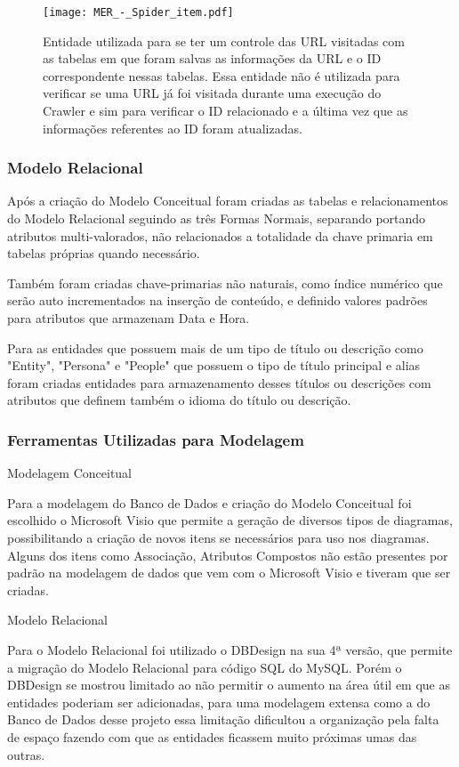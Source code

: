\documentclass[12pt]{article}
\begin{document}
\begin{figure}[H]
\centering
\texttt{[image: MER\_-\_Spider\_item.pdf]}
\caption{Entidade utilizada para se ter um controle das URL visitadas com as tabelas em que foram salvas as informações da URL e o ID correspondente nessas tabelas. Essa entidade não é utilizada para verificar se uma URL já foi visitada durante uma execução do Crawler e sim para verificar o ID relacionado e a última vez que as informações referentes ao ID foram atualizadas.} \label{hash}
\end{figure}

\subsubsection{Modelo Relacional}

Após a criação do Modelo Conceitual foram criadas as tabelas e relacionamentos do Modelo Relacional seguindo as três Formas Normais, separando portando atributos multi-valorados, não relacionados a totalidade da chave primaria em tabelas próprias quando necessário.

Também foram criadas chave-primarias não naturais, como índice numérico que serão auto incrementados na inserção de conteúdo, e definido valores padrões para atributos que armazenam Data e Hora.

Para as entidades que possuem mais de um tipo de título ou descrição como "Entity", "Persona" e "People" que possuem o tipo de título principal e alias foram criadas entidades para armazenamento desses títulos ou descrições com atributos que definem também o idioma do título ou descrição.


\subsubsection{Ferramentas Utilizadas para Modelagem}

Modelagem Conceitual

Para a modelagem do Banco de Dados e criação do Modelo Conceitual foi escolhido o Microsoft Visio que permite a geração de diversos tipos de diagramas, possibilitando a criação de novos itens se necessários para uso nos diagramas. Alguns dos itens como Associação, Atributos Compostos não estão presentes por padrão na modelagem de dados que vem com o Microsoft Visio e tiveram que ser criadas.

Modelo Relacional

Para o Modelo Relacional foi utilizado o DBDesign na sua 4ª versão, que permite a migração do Modelo Relacional para código SQL do MySQL. Porém o DBDesign se mostrou limitado ao não permitir o aumento na área útil em que as entidades poderiam ser adicionadas, para uma modelagem extensa como a do Banco de Dados desse projeto essa limitação dificultou a organização pela falta de espaço fazendo com que as entidades ficassem muito próximas umas das outras. 
\end{document}
